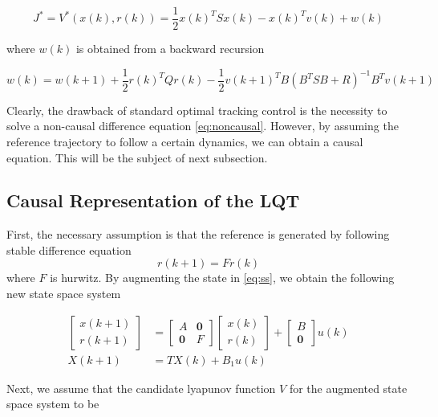 \begin{equation}
J^* = V^*(x(k), r(k)) = \frac{1}{2}x(k)^TSx(k) - x(k)^Tv(k) + w(k)
\end{equation}

where $ w(k) $ is obtained from a backward recursion

\begin{equation}
w(k) = w(k+1) + \frac{1}{2}r(k)^TQr(k) - \frac{1}{2}v(k+1)^TB(B^TSB+R)^{-1}B^Tv(k+1)
\end{equation}

Clearly, the drawback of standard optimal tracking control is the necessity to solve a non-causal difference equation \eqref{eq:noncausal}. However, by assuming the reference trajectory to follow a certain dynamics, we can obtain a causal equation. This will be the subject of next subsection.

\subsection{Causal Representation of the \acs{LQT}}
First, the necessary assumption is that the reference is generated by following stable difference equation
\begin{equation}
r(k+1) = Fr(k) 
\end{equation}
where $ F $ is hurwitz. By augmenting the state in \eqref{eq:ss}, we obtain the following new state space system

\begin{equation}
\begin{split}
\left[ \begin{array}{c}
x(k+1) \\ 
r(k+1)
\end{array} \right] &= \left[\begin{array}{cc}
A & \textbf{0} \\ 
\textbf{0} & F
\end{array}  \right] \left[ \begin{array}{c}
x(k) \\ 
r(k)
\end{array} \right] + \left[ \begin{array}{c}
B \\ 
\textbf{0}
\end{array} \right] u(k) \\
X(k+1) &= TX(k) + B_1u(k)
\end{split}
\end{equation}

Next, we assume that the candidate lyapunov function $V$ for the augmented state space system to be


